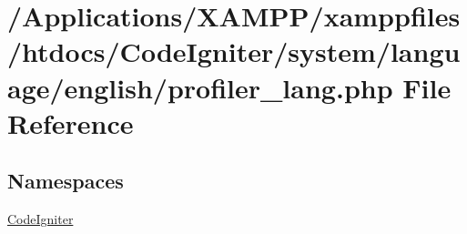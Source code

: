 \hypertarget{profiler__lang_8php}{}\section{/\+Applications/\+X\+A\+M\+P\+P/xamppfiles/htdocs/\+Code\+Igniter/system/language/english/profiler\+\_\+lang.php File Reference}
\label{profiler__lang_8php}
\subsection*{Namespaces}
\begin{DoxyCompactItemize}
\item 
 \mbox{\hyperlink{namespace_code_igniter}{Code\+Igniter}}
\end{DoxyCompactItemize}

